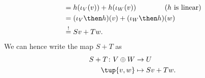 \begin{example}
\begin{equation*}
\begin{aligned}
      &=h(\iota_V(v))+h(\iota_W(v)) \qquad \qquad (h \text{ is linear})\\
      &=(\iota_V\then h)(v)+(\iota_W\then h)(w)\\
      &\overset{!}{=}Sv+Tw.
    \end{aligned}
  \end{equation*}
  We can hence write the map $S+T$ as
  \begin{equation*}
    \begin{aligned}
      S+T\colon V\oplus W&\to U\\
      \tup{v,w}&\mapsto Sv+Tw.
    \end{aligned}
  \end{equation*}
\end{example}



